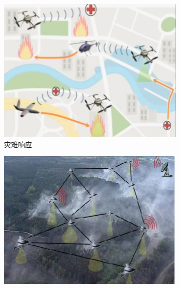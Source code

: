 \begin{figure}[!htbp]
    \begin{subfigure}[t]{0.3\textwidth}
        \captionsetup{justification=centering}
        \begin{minipage}[b]{1\linewidth}
            \includegraphics[width=\textwidth]{./images/灾难响应.png}
            \caption{灾难响应}
        \end{minipage}
    \end{subfigure}
    \begin{subfigure}[t]{0.31\textwidth}
        \captionsetup{justification=centering}
        \begin{minipage}[b]{1\linewidth}
            \includegraphics[width=\textwidth]{./images/森林火情监视.png}

\end{minipage}
\end{subfigure}
\end{figure}
